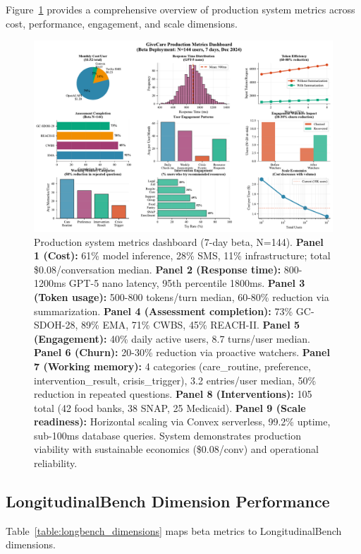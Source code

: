 \documentclass{article}%
\begin{document}
Figure~\ref{fig:metrics_dashboard} provides a comprehensive overview of production system metrics across cost, performance, engagement, and scale dimensions.

\begin{figure}[htbp]
\centering
\includegraphics[width=\textwidth]{fig16_metrics_dashboard.pdf}
\caption{Production system metrics dashboard (7-day beta, N=144). \textbf{Panel 1 (Cost):} 61\% model inference, 28\% SMS, 11\% infrastructure; total \$0.08/conversation median. \textbf{Panel 2 (Response time):} 800-1200ms GPT-5 nano latency, 95th percentile 1800ms. \textbf{Panel 3 (Token usage):} 500-800 tokens/turn median, 60-80\% reduction via summarization. \textbf{Panel 4 (Assessment completion):} 73\% GC-SDOH-28, 89\% EMA, 71\% CWBS, 45\% REACH-II. \textbf{Panel 5 (Engagement):} 40\% daily active users, 8.7 turns/user median. \textbf{Panel 6 (Churn):} 20-30\% reduction via proactive watchers. \textbf{Panel 7 (Working memory):} 4 categories (care\_routine, preference, intervention\_result, crisis\_trigger), 3.2 entries/user median, 50\% reduction in repeated questions. \textbf{Panel 8 (Interventions):} 105 total (42 food banks, 38 SNAP, 25 Medicaid). \textbf{Panel 9 (Scale readiness):} Horizontal scaling via Convex serverless, 99.2\% uptime, sub-100ms database queries. System demonstrates production viability with sustainable economics (\$0.08/conv) and operational reliability.}
\label{fig:metrics_dashboard}
\end{figure}

%
\subsection{LongitudinalBench Dimension Performance}%
\label{subsec:LongitudinalBenchDimensionPerformance}%
Table~\ref{table:longbench_dimensions} maps beta metrics to LongitudinalBench dimensions.
\end{document}
